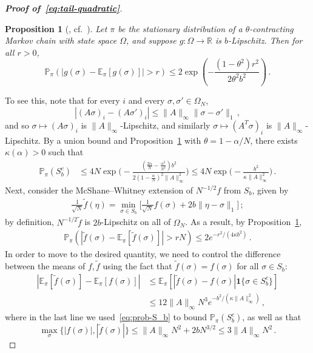 \documentclass[reqno,11pt]{amsart}
\numberwithin{equation}{section}
\newtheorem{proposition}[theorem]{Proposition}
\theoremstyle{definition}{
\newtheorem{example}[theorem]{Example}
\newtheorem{definition}[theorem]{Definition}
\newtheorem*{definition*}{Definition}
\newtheorem{problem}[theorem]{Problem}
\newtheorem{question}[theorem]{Question}
\newtheorem{remark}[theorem]{Remark}
}
\newcommand{\R}{\mathbb R}
\begin{document}
\begin{proof}[\textbf{\emph{Proof of~\eqref{eq:tail-quadratic}}}]
\begin{proposition}[{\cite[Corollary~4.4, Eq.~(4.13)]{Luczak08}}, cf.~\cite{Marton96,Samson00}]\label{prop:luczak-1}
Let $\pi$ be the stationary distribution of a $\theta$-contracting Markov chain with state space $\Omega$, and suppose $g:\Omega\to\R$ is $b$-Lipschitz. Then for all $r>0$,
\[\mathbb P_{\pi} \left( |g(\sigma)-\mathbb E_{\pi} [g(\sigma)]|>r\right) \leq 2\exp\left(-\frac{(1-\theta^2)r^2}{2\theta^2 b^2} \right)\,.
\] 
\end{proposition}
To see this, note that for every $i$ and every $\sigma,\sigma'\in \Omega_N$,
\[\left | (A \sigma)_i - (A \sigma')_i \right|  \leq \|A\|_\infty \|\sigma-\sigma'\|_1\,,\]
and so $\sigma\mapsto (A\sigma)_i$ is $\|A\|_\infty$-Lipschitz, and similarly $\sigma\mapsto (A^T\sigma)_i$ is $\|A\|_\infty$-Lipschitz. By a union bound and Proposition~\ref{prop:luczak-1} with $\theta=1-\alpha/N$, there exists $\kappa(\alpha)>0$ such that
\begin{align}\label{eq:prob-S_b}
\mathbb P_{\pi} (S_b^c) & \leq 4N \exp\bigg(-\frac{(\frac {2\alpha} N - \frac{\alpha^2}{N^2})b^2}{2(1-\frac {\alpha}N)^2\|A\|_\infty ^2}\bigg) \leq 4N \exp\bigg(-\frac{b^2}{\kappa \|A\|_\infty^2}\bigg)\,.
\end{align}
Next, consider the McShane--Whitney extension of $N^{-1/2}f$ from $S_b$, given by 
\begin{align}\label{eq:extension}
\frac 1{\sqrt N} \tilde f(\eta)= \min_{\sigma \in S_b} \bigg[ \frac 1{\sqrt N} f(\sigma)+ 2b \|\eta-\sigma\|_1\bigg ]\,;
\end{align}
by definition, $N^{-1/2} \tilde f$ is $2b$-Lipschitz on all of $\Omega_N$. 
As a result, by Proposition~\ref{prop:luczak-1}, 
\begin{align}\label{eq:conc-extension}
\mathbb P_{\pi} \left( |\tilde f(\sigma)-\mathbb E_{\pi} [\tilde f(\sigma)]| > r N \right) \leq 2e^{-r^2/(4\kappa b^2)}\,.
\end{align}
In order to move to the desired quantity, we need to control the difference between the means of $f, \tilde f$ using the fact that  $\tilde f(\sigma)=f(\sigma)$ for all  $\sigma\in S_b$:
\begin{align}\label{eq:means}
|\mathbb E_{\pi}[\tilde f(\sigma)]-\mathbb E_{\pi}[f(\sigma)]| 
& \leq \mathbb E_{\pi} \left[|\tilde f(\sigma)-f(\sigma)| \boldsymbol 1\{\sigma \in S_b^c\}\right] \nonumber \\
& \leq 12 \|A\|_\infty N^3 e^{-b^2/(\kappa \|A\|_\infty^2)} \,,
\end{align}
where in the last line we used~\eqref{eq:prob-S_b} to bound $\mathbb P_{\pi}(S_b^c)$, as well as that
\[\max_\sigma \{|f(\sigma)|,|\tilde f(\sigma)|\} \leq \|A\|_\infty N^2+2b N^{3/2}\leq 3\|A\|_\infty N^2\,.
\]



\end{proof}
\end{document}
